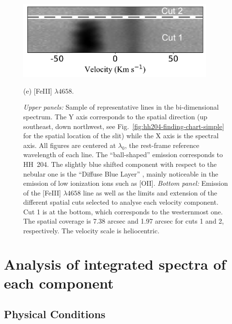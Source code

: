 \documentclass[twocolumn,linenumbers]{aastex63}
\newcommand{\eduardo}[1]{{\color{teal}E: #1}}
\newcommand{\cesar}[1]{{\color{red}C: #1}}
\begin{document}
\begin{figure}
  \begin{minipage}{10cm}
    \centering\includegraphics[height=4cm, width=\columnwidth]{2D_4658_cuts.pdf}
    \centerline{(e) [Fe\thinspace III] $\lambda 4658$.} 
    \smallskip
  \end{minipage}
  \caption{\textit{Upper panels:} Sample of representative lines in the bi-dimensional spectrum. The Y axis corresponds to the spatial direction (up southeast, down northwest, see Fig.~\ref{fig:hh204-finding-chart-simple} for the spatial location of the slit) while the X axis is the spectral axis. All figures are centered at $\lambda_0$, the rest-frame reference wavelength of each line. The ``ball-shaped'' emission corresponds to HH~204. The slightly blue shifted component with respect to the nebular one is the ``Diffuse Blue Layer'' \citep{Deharveng73,garciadiaz07}, mainly noticeable in the emission of low ionization ions such as [O\thinspace II]. \textit{Bottom panel:} Emission of the [Fe\thinspace III] $\lambda 4658$ line as well as the limits and extension of the different spatial cuts selected to analyse each velocity component. Cut 1 is at the bottom, which corresponds to the westernmost one. The spatial coverage is 7.38 arcsec and 1.97 arcsec for cuts 1 and 2, respectively. The velocity scale is heliocentric.}
  \label{fig:cuts}
\end{figure}


\section{Analysis of integrated spectra of each component}
\label{sec:gen_analysis}


\subsection{Physical Conditions}
\label{subsec:physical_cond}
\end{document}
